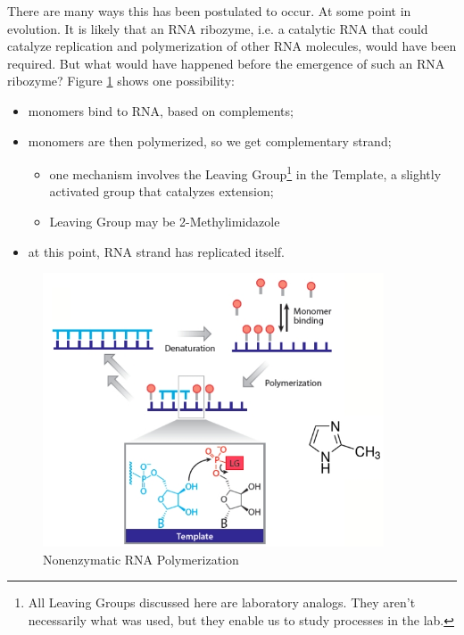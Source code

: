 \documentclass[]{article}
\begin{document}
There are many ways this has been postulated to occur. At some point in evolution. It is likely that an RNA ribozyme, i.e. a catalytic RNA that could catalyze replication and polymerization of other RNA molecules, would have been required. But what would have happened before the emergence of such an RNA ribozyme? Figure \ref{fig:NonenzymaticRNA_Polymerization}\cite{blain2014progress} shows one possibility:
\begin{itemize}
	\item monomers bind to RNA, based on complements;
	\item monomers are then polymerized, so we get complementary strand;
	\begin{itemize}
		\item one mechanism involves the Leaving Group\footnote{All Leaving Groups discussed here are laboratory analogs. They aren't necessarily what was used, but they enable us to study processes in the lab.} in the Template, a slightly activated group that catalyzes extension;
		\item Leaving Group may be 2-Methylimidazole
	\end{itemize} 
	\item at this point, RNA strand has replicated itself.
\end{itemize}


\begin{figure}[H]
	\caption{Nonenzymatic RNA Polymerization}\label{fig:NonenzymaticRNA_Polymerization}
	\includegraphics[width=0.9\textwidth]{NonenzymaticRNA_Polymerization}
\end{figure}
\end{document}
